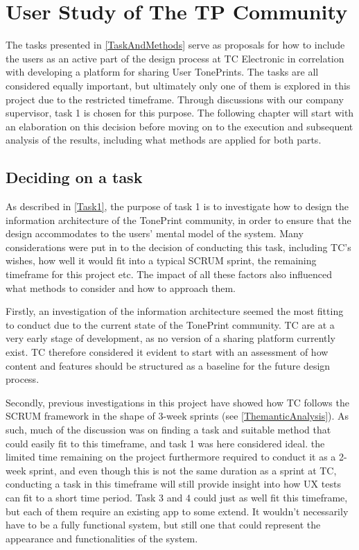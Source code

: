 \chapter{User Study of The TP Community}
\label{ChapterWorkshop}
The tasks presented in \autoref{TaskAndMethods} serve as proposals for how to include the users as an active part of the design process at TC Electronic in correlation with developing a platform for sharing User TonePrints. The tasks are all considered equally important, but ultimately only one of them is explored in this project due to the restricted timeframe. Through discussions with our company supervisor, task 1 is chosen for this purpose. The following chapter will start with an elaboration on this decision before moving on to the execution and subsequent analysis of the results, including what methods are applied for both parts.

\section{Deciding on a task}
\label{TaskDecision}
As described in \autoref{Task1}, the purpose of task 1 is to investigate how to design the information architecture of the TonePrint community, in order to ensure that the design accommodates to the users' mental model of the system. Many considerations were put in to the decision of conducting this task, including TC's wishes, how well it would fit into a typical SCRUM sprint, the remaining timeframe for this project etc. The impact of all these factors also influenced what methods to consider and how to approach them.

Firstly, an investigation of the information architecture seemed the most fitting to conduct due to the current state of the TonePrint community. TC are at a very early stage of development, as no version of a sharing platform currently exist. TC therefore considered it evident to start with an assessment of how content and features should be structured as a baseline for the future design process.

Secondly, previous investigations in this project have showed how TC follows the SCRUM framework in the shape of 3-week sprints (see \autoref{ThemanticAnalysis}). As such, much of the discussion was on finding a task and suitable method that could easily fit to this timeframe, and task 1 was here considered ideal. the limited time remaining on the project furthermore required to conduct it as a 2-week sprint, and even though this is not the same duration as a sprint at TC, conducting a task in this timeframe will still provide insight into how UX tests can fit to a short time period. Task 3 and 4 could just as well fit this timeframe, but each of them require an existing app to some extend. It wouldn't necessarily have to be a fully functional system, but still one that could represent the appearance and functionalities of the system.


